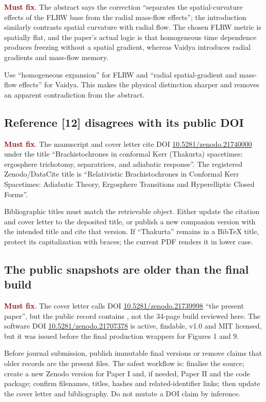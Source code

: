 \documentclass[11pt,a4paper]{article}
\newcommand{\must}{\textcolor{DarkRed}{\textbf{Must fix}}}
\begin{document}
\must. The abstract says the correction ``separates the spatial-curvature effects of the FLRW
base from the radial mass-flow effects''; the introduction similarly contrasts spatial
curvature with radial flow. The chosen FLRW metric is spatially flat, and the paper's actual
logic is that homogeneous time dependence produces freezing without a spatial gradient,
whereas Vaidya introduces radial gradients and mass-flow memory.

Use ``homogeneous expansion'' for FLRW and ``radial spatial-gradient and mass-flow effects'' for
Vaidya. This makes the physical distinction sharper and removes an apparent contradiction from
the abstract.

\subsection{Reference [12] disagrees with its public DOI}

\must. The manuscript and cover letter cite DOI
\href{https://doi.org/10.5281/zenodo.21740000}{10.5281/zenodo.21740000} under the title
``Brachistochrones in conformal Kerr (Thakurta) spacetimes: ergosphere trichotomy,
separatrices, and adiabatic response''. The registered Zenodo/DataCite title is
``Relativistic Brachistochrones in Conformal Kerr Spacetimes: Adiabatic Theory,
Ergosphere Transitions and Hyperelliptic Closed Forms''.

Bibliographic titles must match the retrievable object. Either update the citation and cover
letter to the deposited title, or publish a new companion version with the intended title and
cite that version. If ``Thakurta'' remains in a BibTeX title, protect its capitalization with
braces; the current PDF renders it in lower case.

\subsection{The public snapshots are older than the final build}

\must. The cover letter calls DOI
\href{https://doi.org/10.5281/zenodo.21739998}{10.5281/zenodo.21739998} ``the present paper'',
but the public record contains , not the 34-page build reviewed here. The
software DOI \href{https://doi.org/10.5281/zenodo.21707378}{10.5281/zenodo.21707378} is active,
findable, v1.0 and MIT licensed, but it was issued before the final production wrappers for
Figures 1 and 9.

Before journal submission, publish immutable final versions or remove claims that older records
are the present files. The safest workflow is: finalise the source; create a new Zenodo version
for Paper I and, if needed, Paper II and the code package; confirm filenames, titles, hashes and
related-identifier links; then update the cover letter and bibliography. Do not mutate a DOI
claim by inference.
\end{document}
